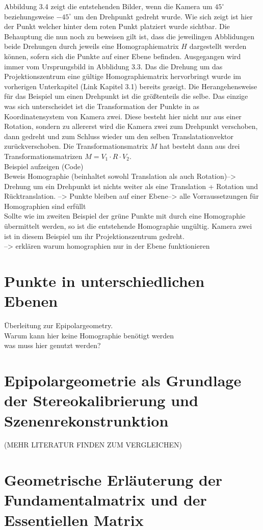 Abbildung 3.4 zeigt die entstehenden Bilder, wenn die Kamera um \ensuremath{45^\circ} beziehungsweise \ensuremath{-45^\circ} um den Drehpunkt gedreht wurde. Wie sich zeigt ist hier der Punkt welcher hinter dem roten Punkt platziert wurde sichtbar. Die Behauptung die nun noch zu beweisen gilt ist, dass die jeweilingen Abblidungen beide Drehungen durch jeweils eine Homographiematrix $H$ dargestellt werden können, sofern sich die Punkte auf einer Ebene befinden. Ausgegangen wird immer vom Ursprungsbild in Abblidung 3.3. Das die Drehung um das Projektionszentrum eine gültige Homographiematrix hervorbringt wurde im vorherigen Unterkapitel (Link Kapitel 3.1) bereits gezeigt. Die Herangehensweise für das Beispiel um einen Drehpunkt ist die größtenteils die selbe. Das einzige was sich unterscheidet ist die Transformation der Punkte in as Koordinatensystem von Kamera zwei. Diese besteht hier nicht nur aus einer Rotation, sondern zu allererst wird die Kamera zwei zum Drehpunkt verschoben, dann gedreht und zum Schluss wieder um den selben Translatationvektor zurückverschoben. Die Transformationsmatrix $M$ hat besteht dann aus drei Transformationsmatrizen \ensuremath{M = V_1 \cdot R \cdot V_2}. \\


Beispiel aufzeigen (Code)\\

Beweis Homographie (beinhaltet sowohl Translation als auch Rotation)--> Drehung um ein Drehpunkt ist nichts weiter als eine Translation + Rotation und Rücktranslation. --> Punkte bleiben auf einer Ebene--> alle Vorraussetzungen für Homographien sind erfüllt\\



 Sollte wie im zweiten Beispiel der grüne Punkte mit durch eine Homographie übermittelt werden, so ist die entstehende Homographie ungültig. Kamera zwei ist in diesem Beispiel um ihr Projektionszentrum gedreht.\\



--> erklären warum homographien nur in der Ebene funktionieren


\section{Punkte in unterschiedlichen Ebenen}

Überleitung zur Epipolargeometry.\\
Warum kann hier keine Homographie benötigt werden\\
was muss hier genutzt werden?

\section{Epipolargeometrie als Grundlage der Stereokalibrierung und Szenenrekonstrunktion}


(MEHR LITERATUR FINDEN ZUM VERGLEICHEN)

\section{Geometrische Erläuterung der Fundamentalmatrix und der Essentiellen Matrix }








